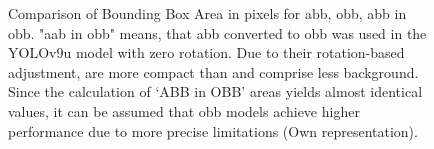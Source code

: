 \begin{figure}[htbp]
    \centering
    
    \caption[Comparison of Bounding Box Area in pixels for \acrshort{abb}, \acrshort{obb}, abb in obb]{Comparison of Bounding Box Area in pixels for \acrshort{abb}, \acrshort{obb}, abb in obb. "aab in obb" means, that \acrlong{abb} converted to obb was used in the \acrshort{YOLO}v9u model with zero rotation. Due to their rotation-based adjustment,  are more compact than  and comprise less background. Since the calculation of ‘ABB in OBB’ areas yields almost identical values, it can be assumed that \acrshort{obb} models achieve higher performance due to more precise limitations (Own representation).}
    \label{fig:bbox_area}
\end{figure}


